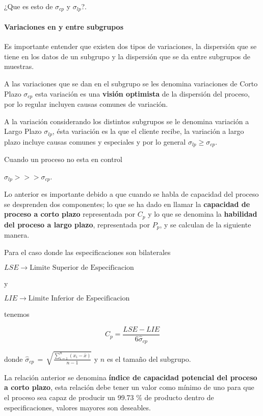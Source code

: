 \documentclass[english]{report}
\begin{document}
¿Que es esto de $\sigma_{cp}$ y $\sigma_{lp}$?. 

\paragraph{Variaciones en y entre subgrupos}

Es importante entender que existen dos tipos de variaciones, la dispersión que se tiene en los datos de un subgrupo y la dispersión que se da entre subgrupos de muestras. 

A las variaciones que se dan en el subgrupo se les denomina variaciones de Corto Plazo $\sigma_{cp}$ esta variación es una \textbf{visión optimista} de la dispersión del proceso, por lo regular incluyen causas comunes de variación.

A la variación considerando los distintos subgrupos se le denomina variación a Largo Plazo $\sigma_{lp}$, ésta variación es la que el cliente recibe, la variación a largo plazo incluye causas comunes y especiales y por lo general $\sigma_{lp}\geq\sigma_{cp}$.

Cuando un proceso no esta en control

$\sigma_{lp}>>>\sigma_{cp}$.
 
Lo anterior es importante debido a que cuando se habla de capacidad del proceso se desprenden dos componentes; lo que se ha dado en llamar la \textbf{capacidad de proceso a corto plazo} representada por $C_{p}$ y lo que se denomina la \textbf{habilidad del proceso a largo plazo}, representada por $P_{p}$, y se calculan de la siguiente manera.

\medskip 
Para el caso donde las especificaciones son bilaterales

$LSE\rightarrow\text{Limite Superior de Especificacion}$

y

$LIE\rightarrow\text{Limite Inferior de Especificacion}$

tenemos

\begin{equation}
{C}_{p}=\frac{LSE-LIE}{6\hat{\sigma}_{cp}}
\label{c2eq10}
\end{equation}

donde $\hat{\sigma}_{cp}\,=\,\sqrt{\frac{\sum_{i=1}^{n}(x_{i}-\bar{x})}{n-1}}$ y $n$ es el tamaño del subgrupo.

La relación anterior se denomina \textbf{índice de capacidad potencial
del proceso a corto plazo}, esta relación debe tener un valor como
mínimo de uno para que el proceso sea capaz de producir un 99.73 \%
de producto dentro de especificaciones, valores mayores son deseables.
\end{document}
